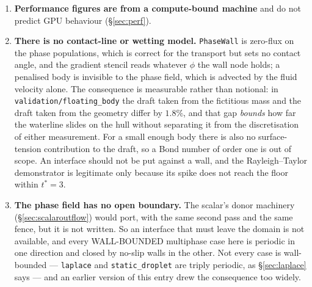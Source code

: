 \documentclass[11pt,a4paper]{article}
\newcommand{\code}[1]{\texttt{\small #1}}
\begin{document}
\begin{enumerate}[leftmargin=1.4em,itemsep=4pt]
\item \textbf{Performance figures are from a compute-bound machine} and do not
  predict GPU behaviour (\S\ref{sec:perf}).

\item \textbf{There is no contact-line or wetting model.} \code{PhaseWall} is
  zero-flux on the phase populations, which is correct for the transport but sets
  no contact angle, and the gradient stencil reads whatever $\phi$ the wall node
  holds; a penalised body is invisible to the phase field, which is advected by
  the fluid velocity alone. The consequence is measurable rather than notional:
  in \code{validation/floating\_body} the draft taken from the fictitious mass
  and the draft taken from the geometry differ by $1.8\%$, and that gap
  \emph{bounds} how far the waterline slides on the hull without separating it
  from the discretisation of either measurement. For a small enough body there
  is also no surface-tension contribution to the draft, so a Bond number of
  order one is out of scope. An interface should not be put against a wall, and
  the Rayleigh--Taylor demonstrator is legitimate only because its spike does
  not reach the floor within $t^{*}=3$.

\item \textbf{The phase field has no open boundary.} The scalar's donor
  machinery (\S\ref{sec:scalaroutflow}) would port, with the same second pass
  and the same fence, but it is not written. So an interface that must leave the
  domain is not available, and every WALL-BOUNDED multiphase case here is
  periodic in one direction and closed by no-slip walls in the other. Not every
  case is wall-bounded --- \code{laplace} and \code{static\_droplet} are triply
  periodic, as \S\ref{sec:laplace} says --- and an earlier version of this entry
  drew the consequence too widely.


\end{enumerate}
\end{document}
